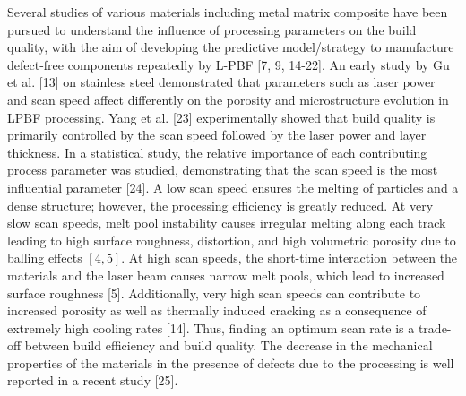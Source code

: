 \documentclass[10pt]{article}
\begin{document}
Several studies of various materials including metal matrix composite have been pursued to understand the influence of processing parameters on the build quality, with the aim of developing the predictive model/strategy to manufacture defect-free components repeatedly by L-PBF [7, 9, 14-22]. An early study by Gu et al. [13] on stainless steel demonstrated that parameters such as laser power and scan speed affect differently on the porosity and microstructure evolution in LPBF processing. Yang et al. [23] experimentally showed that build quality is primarily controlled by the scan speed followed by the laser power and layer thickness. In a statistical study, the relative importance of each contributing process parameter was studied, demonstrating that the scan speed is the most influential parameter [24]. A low scan speed ensures the melting of particles and a dense structure; however, the processing efficiency is greatly reduced. At very slow scan speeds, melt pool instability causes irregular melting along each track leading to high surface roughness, distortion, and high volumetric porosity due to balling effects $[4,5]$. At high scan speeds, the short-time interaction between the materials and the laser beam causes narrow melt pools, which lead to increased surface roughness [5]. Additionally, very high scan speeds can contribute to increased porosity as well as thermally induced cracking as a consequence of extremely high cooling rates [14]. Thus, finding an optimum scan rate is a trade-off between build efficiency and build quality. The decrease in the mechanical properties of the materials in the presence of defects due to the processing is well reported in a recent study [25].
\end{document}
